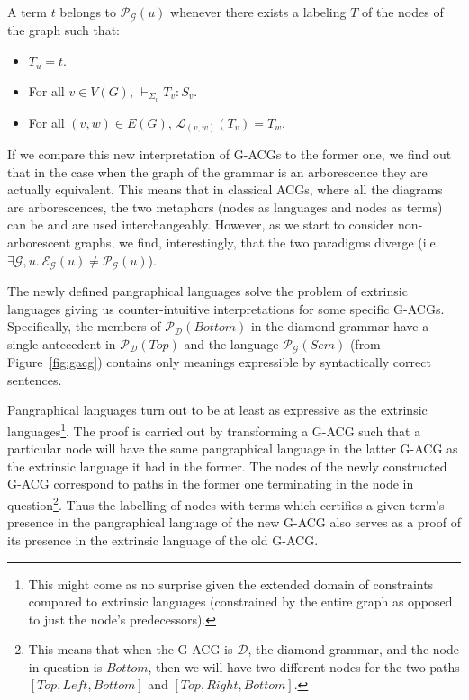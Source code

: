 \documentclass{llncs}
\begin{document}
A term $t$ belongs to $\mathcal{P}_{\mathcal{G}}(u)$ whenever there
exists a labeling $T$ of the nodes of the graph such that:

\begin{itemize}
  \item $T_u = t$.
  \item For all $v \in V(G)$, $\vdash_{\Sigma_v} T_v : S_v$.
  \item For all $(v,w) \in E(G)$, $\mathcal{L}_{(v,w)}(T_v) = T_w$.
\end{itemize}

If we compare this new interpretation of G-ACGs to the former one, we find out
that in the case when the graph of the grammar is an arborescence they are
actually equivalent. This means that in classical ACGs, where all the diagrams
are arborescences, the two metaphors (nodes as languages and nodes as terms)
can be and are used interchangeably. However, as we start to consider
non-arborescent graphs, we find, interestingly, that the two paradigms diverge
(i.e. $\exists \mathcal{G}, u.\ \mathcal{E}_{\mathcal{G}}(u) \neq
\mathcal{P}_{\mathcal{G}}(u)$).

The newly defined pangraphical languages solve the problem of extrinsic
languages giving us counter-intuitive interpretations for some specific
G-ACGs. Specifically, the members of $\mathcal{P}_{\mathcal{D}}(Bottom)$ in
the diamond grammar have a single antecedent in
$\mathcal{P}_{\mathcal{D}}(Top)$ and the language
$\mathcal{P}_{\mathcal{G}}(Sem)$ (from Figure~\ref{fig:gacg}) contains only
meanings expressible by syntactically correct sentences.

Pangraphical languages turn out to be at least as expressive as the extrinsic
languages\footnote{This might come as no surprise given the extended domain of
  constraints compared to extrinsic languages (constrained by the entire graph
  as opposed to just the node's predecessors).}. The proof is carried out by
transforming a G-ACG such that a particular node will have the same
pangraphical language in the latter G-ACG as the extrinsic language it had in
the former. The nodes of the newly constructed G-ACG correspond to paths in
the former one terminating in the node in question\footnote{This means that
  when the G-ACG is $\mathcal{D}$, the diamond grammar, and the node in
  question is $Bottom$, then we will have two different nodes for the two
  paths $[Top, Left, Bottom]$ and $[Top, Right, Bottom]$.}. Thus the labelling
of nodes with terms which certifies a given term's presence in the
pangraphical language of the new G-ACG also serves as a proof of its presence
in the extrinsic language of the old G-ACG.
\end{document}

